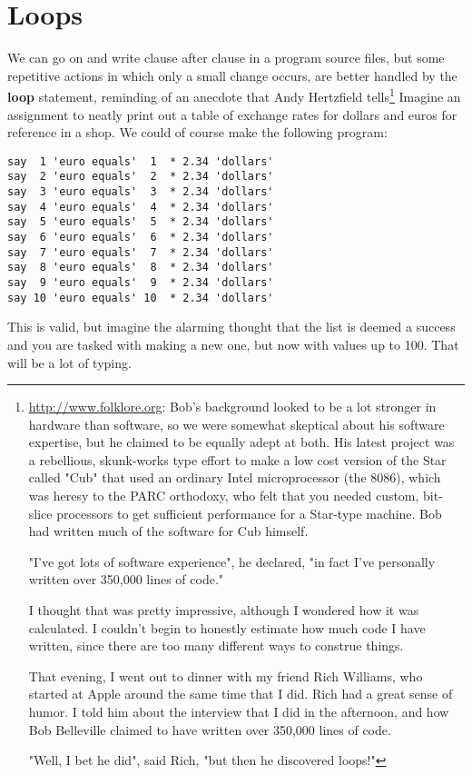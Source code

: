 {\section{Loops}
We can go on and write clause after clause in a program source files,
but some repetitive actions in which only a small change occurs, are
better handled by the \textbf{loop} statement, reminding
of an anecdote that Andy Hertzfield tells\footnote{\url{http://www.folklore.org}:
Bob's background looked to be a lot stronger in hardware than software, so we were somewhat skeptical about his software expertise, but he claimed to be equally adept at both. His latest project was a rebellious, skunk-works type effort to make a low cost version of the Star called "Cub" that used an ordinary Intel microprocessor (the 8086), which was heresy to the PARC orthodoxy, who felt that you needed custom, bit-slice processors to get sufficient performance for a Star-type machine. Bob had written much of the software for Cub himself. 

"I've got lots of software experience", he declared, "in fact I've personally written over 350,000 lines of code." 

I thought that was pretty impressive, although I wondered how it was calculated. I couldn't begin to honestly estimate how much code I have written, since there are too many different ways to construe things. 

That evening, I went out to dinner with my friend Rich Williams, who started at Apple around the same time that I did. Rich had a great sense of humor. I told him about the interview that I did in the afternoon, and how Bob Belleville claimed to have written over 350,000 lines of code. 

"Well, I bet he did", said Rich, "but then he discovered loops!"}
Imagine an assignment to neatly print out a table of exchange rates for
dollars and euros for reference in a shop. We could of course make the
following program:
\begin{lstlisting}[label=withoutloop,caption=Without a loop]
say  1 'euro equals'  1  * 2.34 'dollars'
say  2 'euro equals'  2  * 2.34 'dollars'
say  3 'euro equals'  3  * 2.34 'dollars'
say  4 'euro equals'  4  * 2.34 'dollars'
say  5 'euro equals'  5  * 2.34 'dollars'
say  6 'euro equals'  6  * 2.34 'dollars'
say  7 'euro equals'  7  * 2.34 'dollars'
say  8 'euro equals'  8  * 2.34 'dollars'
say  9 'euro equals'  9  * 2.34 'dollars'
say 10 'euro equals' 10  * 2.34 'dollars'
\end{lstlisting}
This is valid, but imagine the alarming thought that the list is deemed
a success and you are tasked with making a new one, but now with
values up to 100. That will be a lot of typing.

}
